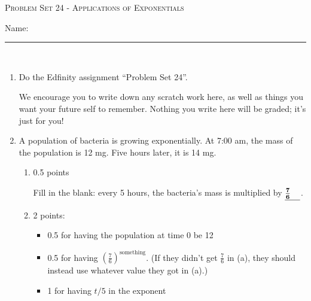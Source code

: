 \documentclass{article}
\newcommand{\doedfinity}[2][\newpage]{
  \begin{problem}[#1]
    Do the Edfinity assignment ``Problem Set #2''.

    We encourage you to write down any scratch work here, as well as
    things you want your future self to remember. Nothing you write
    here will be graded; it's just for you!
  \end{problem}
}
\begin{document}
\begin{center}
  \large\textsc{Problem Set 24 - Applications of Exponentials}\vspace{.5in}\\
  \begin{problemonly}
   \large Name: \rule{5cm}{0.15mm}\\
   \end{problemonly}
\end{center}

\begin{enumerate}
\item  {}  

  \doedfinity{24}

\item %

  A population of bacteria is growing exponentially. At 7:00 am, the mass of the population is 12 mg. Five hours later, it is 14 mg.

  \begin{enumerate}

  \item

    \begin{grading}
      0.5 points
    \end{grading}

    \begin{problem}[0.25in]
      Fill in the blank: every 5 hours, the bacteria's mass is multiplied by $\fitb{0.25in}{\frac{7}{6}}$.
    \end{problem}

  \item

    \begin{grading}
      2 points:
      \begin{itemize}[nosep]
      \item 0.5 for having the population at time 0 be 12
      \item 0.5 for having $\left( \frac{7}{6} \right)^\text{something}$. (If they didn't get $\frac{7}{6}$ in (a), they should instead use whatever value they got in (a).)
      \item 1 for having $t / 5$ in the exponent
      \end{itemize}


\end{grading}
\end{enumerate}
\end{enumerate}
\end{document}
